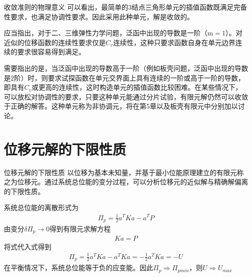 \documentclass[11pt]{beamer}
\begin{document}
\begin{frame}{收敛准则的物理意义}
可以看出，最简单的3结点三角形单元的插值函数既满足完备性要求，也满足协调性要求。因此采用此种单元，解是收敛的。
\par
应当指出，对于二、三维弹性力学问题，泛函中出现的导数是一阶（m$=1$）。对近似的位移函数的连续性要求仅是$C_{v}$连续性，这种只要求函数自身在单元边界连续的要求很容易得到满足。
\par
需要指出的是，当泛函中出现的导数高于一阶（例如板壳问题，泛函中出现的导数是2阶）时，则要求试探函数在单元交界面上具有连续的一阶或高于一阶的导数，即具有$C_{v}$或更高的连续性，这时构造单元的插值函数比较困难。在某些情况下，可以放松对协调性的要求，只要这种单元能通过分片试验，有限元解仍然可以收敛于正确的解答。这种单元称为非协调元，将在第5章以及板壳有限元中分别加以讨论。
\end{frame}

%       
\section{位移元解的下限性质}
\begin{frame}{位移元解的下限性质}
以位移为基本未知量，并基于最小位能原理建立的有限元称之为位移元。通过系统总位能的变分过程，可以分析位移元的近似解与精确解偏离的下限性质。
\par
系统总位能的离散形式为
\begin{align*}
\Pi_{p}=\frac{1}{2}a^{T}Ka-a^{T}P
\end{align*}
由变分$\delta\Pi_{p}\to0$得到有限元求解方程
\begin{align*}
Ka=P
\end{align*}
将式代入式得到
\begin{align*}
\Pi_{p}=\frac{1}{2}a^{T}Ka-a^{T}Ka=-\frac{1}{2}a^{T}Ka=-U
\end{align*}
在平衡情况下，系统总位能等于负的应变能。因此$\Pi_{p}\Rightarrow\Pi_{pmin}$，则$U\Rightarrow U_{max}$
\end{frame}
\end{document}
